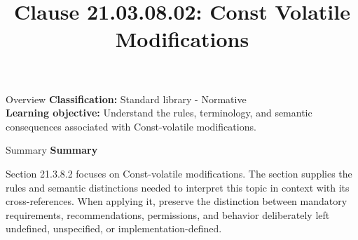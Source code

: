 \documentclass[10pt,letterpaper]{article}
\title{Clause 21.03.08.02: Const Volatile Modifications}
\author{}
\date{}
\begin{document}
\maketitle
\begin{CornellOverviewBox}{Overview}
\textbf{Classification:} Standard library - Normative\\[2pt]
\textbf{Learning objective:} Understand the rules, terminology, and semantic consequences associated with Const-volatile modifications.
\end{CornellOverviewBox}\begin{CornellSummaryBox}{Summary}
{\sffamily\bfseries\color{Accent} Summary}\par\vspace{3pt}Section 21.3.8.2 focuses on Const-volatile modifications. The section supplies the rules and semantic distinctions needed to interpret this topic in context with its cross-references. When applying it, preserve the distinction between mandatory requirements, recommendations, permissions, and behavior deliberately left undefined, unspecified, or implementation-defined.
\end{CornellSummaryBox}
\end{document}
